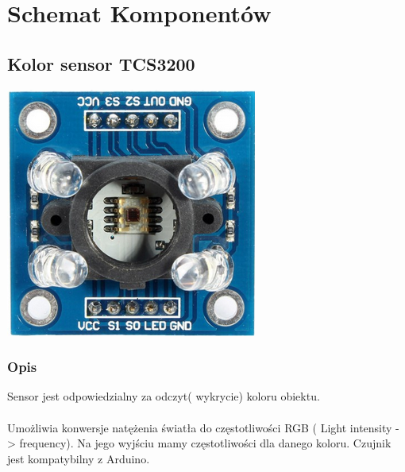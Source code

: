 \documentclass[12pt]{article}
\begin{document}
\section{Schemat Komponentów}
\subsection{Kolor sensor TCS3200}
\begin{center}
\begin{minipage}[H]{.45\textwidth}
    \includegraphics[width=.8\linewidth]{tcs.png}
\end{minipage}
\end{center}
\subsubsection{Opis}
Sensor jest odpowiedzialny za odczyt( wykrycie) koloru obiektu.\\
\\
Umożliwia konwersje natężenia światła do częstotliwości RGB
 ( Light    intensity -> frequency). Na jego wyjściu mamy częstotliwości dla danego koloru. Czujnik jest kompatybilny z Arduino. 
\end{document}
